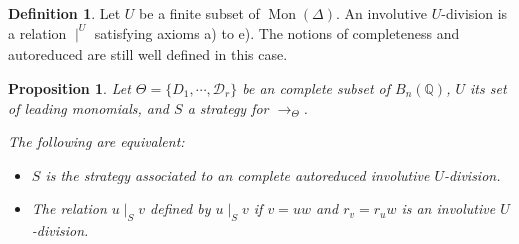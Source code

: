 \documentclass[10pt]{easychair}
\newtheorem{proposition}[theorem]{Proposition}
\theoremstyle{definition}
\newtheorem{definition}[theorem]{Definition}
\newcommand\D{\mathcal{D}}
\newcommand\Q{\mathbb{Q}}
\newcommand\Weyl[1]{B_{#1}(\Q)}
\DeclareMathOperator{\Mon}{Mon}
\newcommand\rewTheta{\to_{\Theta}}
\newcommand\divInv[1]{\mid_{#1}}
\begin{document}
\begin{definition}
  Let $U$ be a finite subset of $\Mon(\Delta)$. An involutive $U$-division is a relation $\divInv{}^U$ satisfying axioms a) to e). The notions of completeness and autoreduced are still well defined in this case.
\end{definition}

\begin{proposition}
Let $\Theta=\{D_1,\cdots,\D_r\}$ be an complete subset of
$\Weyl{n}$,  $U$ its set of leading monomials, and $S$ a strategy for $\rewTheta$.

The following are equivalent:
\begin{itemize}
\item $S$ is the strategy associated to an complete autoreduced involutive $U$-division.
\item The relation $u \divInv{S} v$ defined by $u \divInv{S} v$ if $v = u w$ and $r_v = r_u w$ is an involutive $U$-division. 
\end{itemize}
\end{proposition}
\end{document}
